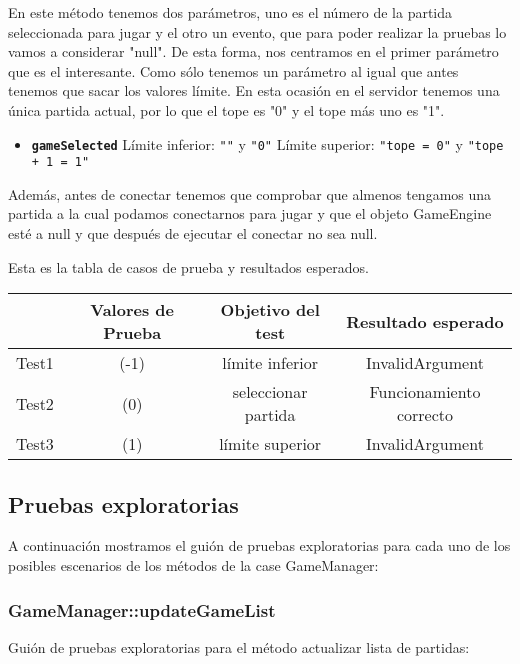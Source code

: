 En este método tenemos dos parámetros, uno es el número de la partida seleccionada para jugar y el otro un evento, que para poder realizar la pruebas lo vamos a considerar "null". De esta forma, nos centramos en el primer parámetro que es el interesante. Como sólo tenemos un parámetro al igual que antes tenemos que sacar los valores límite. En esta ocasión en el servidor tenemos una única partida actual, por lo que el tope es "0" y el tope más uno es "1".

\begin{itemize}
\item \textbf{\texttt{gameSelected}}
\subitem Límite inferior: \texttt{""} y \texttt{"0"}
\subitem Límite superior: \texttt{"tope = 0"} y \texttt{"tope + 1 = 1"}
\end{itemize}

Además, antes de conectar tenemos que comprobar que almenos tengamos una partida a la cual podamos conectarnos para jugar y que el objeto GameEngine esté a null y que después de ejecutar el conectar no sea null.

Esta es la tabla de casos de prueba y resultados esperados.

{\footnotesize
\begin{longtable}[c]{lccc}
 & \textbf{Valores de Prueba} & \textbf{Objetivo del test} & \textbf{Resultado esperado} \\
\hline \hline
\endhead

Test1 & (-1) & límite inferior & InvalidArgument\\
Test2 & (0) & seleccionar partida & Funcionamiento correcto\\
Test3 & (1) & límite superior & InvalidArgument\\

\hline
\end{longtable}
}


\subsection{Pruebas exploratorias}

A continuación mostramos el guión de pruebas exploratorias para cada uno de los posibles escenarios de los métodos de la case GameManager:

\subsubsection{GameManager::updateGameList}

Guión de pruebas exploratorias para el método actualizar lista de partidas:

